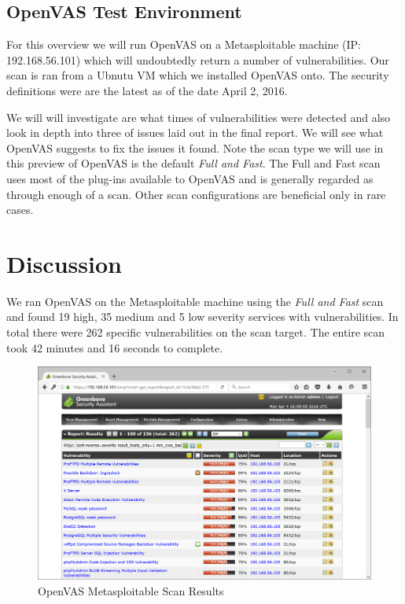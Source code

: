\documentclass[12pt]{article}
\begin{document}
\subsection{OpenVAS Test Environment}
\label{sec:testenv}
For this overview we will run OpenVAS on a Metasploitable machine 
(IP: 192.168.56.101) which will undoubtedly return a number of 
vulnerabilities. Our scan is ran from a Ubnutu VM which we installed OpenVAS 
onto. The security definitions were are the latest as of the date April 2, 
2016. 

We will will investigate are what times of vulnerabilities were detected and
also look in depth into three of issues laid out in the final report. We will
see what OpenVAS suggests to fix the issues it found. Note the scan type we 
will use in this preview of OpenVAS is the default \textit{Full and Fast}.
The Full and Fast scan uses most of the plug-ins available to OpenVAS and is
generally regarded as through enough of a scan. Other scan configurations
are beneficial only in rare cases. 

\section{Discussion}
\label{sect:discussion}
We ran OpenVAS on the Metasploitable machine using the \textit{Full and Fast}
scan and found 19 high, 35 medium and 5 low severity services with 
vulnerabilities. In total there were 262 specific vulnerabilities on the 
scan target. The entire scan took 42 minutes and 16 seconds to complete. 

\begin{figure}[H]
    \centering
    \includegraphics[width=5.5in]{images/20160403-metasploitable-scan.PNG}
    \caption{OpenVAS Metasploitable Scan Results}
    \label{fig:overview_scan}
\end{figure}
\end{document}
